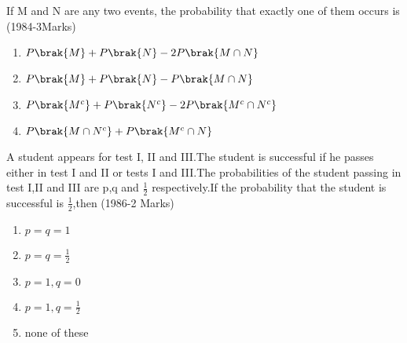 
\iffalse
  \title{Assignment}
  \author{AI24BTECH11024-Pappuri Prahladha}
  \section{mcq-multiple}
\fi

        \item If M and N are any two events, the probability that exactly one of them occurs is \hfill (1984-3Marks)
    \begin{enumerate}
    \item $P\brak{M}+P\brak{N}-2P\brak{M\cap N}$
    \item $P\brak{M}+P\brak{N}-P\brak{M\cap N}$
    \item $P\brak{M^{c}}+P\brak{N^{c}}-2P\brak{M^{c}\cap N^{c}}$
    \item $P\brak{M\cap N^{c}}+P\brak{M^{c}\cap N}$    
    \end{enumerate}
    \item A student appears for test I, II and III.The student is successful if he passes either in test I and II or tests I and III.The probabilities of the student passing in test I,II and III are p,q and $\frac{1}{2}$ respectively.If the probability that the student is successful is $\frac{1}{2}$,then \hfill (1986-2 Marks)
    \begin{multicols}{2}
    \begin{enumerate}
        \item $p=q=1$
        \item $p=q=\frac{1}{2}$
        \item $p=1,q=0$
        \item $p=1,q=\frac{1}{2}$
        \item none of these
    \end{enumerate}
        
    \end{multicols}


